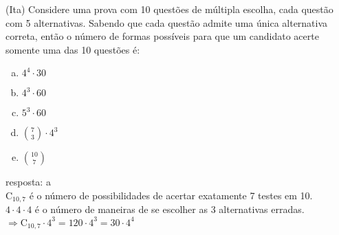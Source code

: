 \begin{ex}
 (Ita) Considere uma prova com 10 questões de múltipla escolha, cada questão com 5 alternativas. Sabendo que cada questão admite uma única alternativa correta, então o número de formas possíveis para que um candidato acerte somente uma das 10 questões é:
    \begin{enumerate}[(a)]
    \item $ 4^4 \cdot 30$
    \item $ 4^3 \cdot 60$
    \item $ 5^3 \cdot 60$
    \item $\binom{7}{3}\cdot4^3$
    \item $\binom{10}{7}$
    \end{enumerate}
      \begin{sol}
        resposta: a \\
        $\mathrm{C}_{{10},7}$ é o número de possibilidades de acertar exatamente 7 testes em 10. \\
        $4\cdot4\cdot4$  é o número de maneiras de se escolher as 3 alternativas erradas. \\
        $\Longrightarrow \mathrm{C}_{{10},7}\cdot4^3=120\cdot4^3=30\cdot4^4$
      \end{sol}
\end{ex}